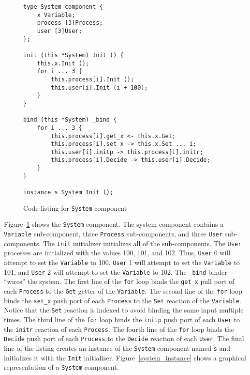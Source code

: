 \begin{figure}
\begin{verbatim}
type System component {
    x Variable;
    process [3]Process;
    user [3]User;
};

init (this *System) Init () {
    this.x.Init ();
    for i ... 3 {
        this.process[i].Init ();
        this.user[i].Init (i + 100);
    }
}

bind (this *System) _bind {
    for i ... 3 {
        this.process[i].get_x <- this.x.Get;
        this.process[i].set_x -> this.x.Set ... i;
        this.user[i].initp -> this.process[i].initr;
        this.process[i].Decide -> this.user[i].Decide;
    }
}

instance s System Init ();
\end{verbatim}
\cprotect\caption{Code listing for \verb+System+ component \label{system}}
\end{figure}

Figure~\ref{system} shows the \verb+System+ component.
The system component contains a \verb+Variable+ sub-component, three \verb+Process+ sub-components, and three \verb+User+ sub-components.
The \verb+Init+ initializer initializes all of the sub-components.
The \verb+User+ processes are initialized with the values 100, 101, and 102.
Thus, \verb+User+ 0 will attempt to set the \verb+Variable+ to 100, \verb+User+ 1 will attempt to set the \verb+Variable+ to 101, and \verb+User+ 2 will attempt to set the \verb+Variable+ to 102.
The \verb+_bind+ binder ``wires'' the system.
The first line of the \verb+for+ loop binds the \verb+get_x+ pull port of each \verb+Process+ to the \verb+Get+ getter of the \verb+Variable+.
The second line of the \verb+for+ loop binds the \verb+set_x+ push port of each \verb+Process+ to the \verb+Set+ reaction of the \verb+Variable+.
Notice that the \verb+Set+ reaction is indexed to avoid binding the same input multiple times.
The third line of the \verb+for+ loop binds the \verb+initp+ push port of each \verb+User+ to the \verb+initr+ reaction of each \verb+Process+.
The fourth line of the \verb+for+ loop binds the \verb+Decide+ push port of each \verb+Process+ to the \verb+Decide+ reaction of each \verb+User+.
The final line of the listing creates an instance of the \verb+System+ component named \verb+s+ and initializes it with the \verb+Init+ initializer.
Figure~\ref{system_instance} shows a graphical representation of a \verb+System+ component.

